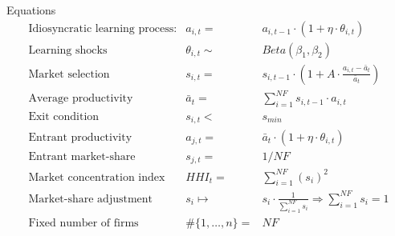 \documentclass[bigger,aspectratio=169]{beamer}
\begin{document}
\begin{frame}[label={sec:org4f0eff8}]{Equations}
\[ \begin{array}{lrl}
\mbox{Idiosyncratic learning process:} & a_{i,t} = &a_{i,t-1}\cdot (1 + \eta\cdot\theta_{i,t})\\
\mbox{Learning shocks} & \theta_{i,t} \sim  & Beta(\beta_1, \beta_2)\\
\mbox{Market selection} & s_{i,t} =  & s_{i,t-1} \cdot \left( 1 + A\cdot\frac{a_{i,t} - \bar{a}_{t}}{\bar{a}_{t}}\right) \\
\mbox{Average productivity} & \bar{a}_{t} =  & \sum_{i=1}^{NF} s_{i, t-1}\cdot a_{i,t} \\
\mbox{Exit condition} & s_{i,t} < & s_{min}\\
\mbox{Entrant productivity} & a_{j,t} =&  \bar{a}_{t}\cdot (1 + \eta\cdot\theta_{i,t})\\
\mbox{Entrant market-share} & s_{j,t} =& 1/NF \\
\mbox{Market concentration index} & HHI_{t} =& \sum_{i=1}^{NF} (s_{i})^2 \\
\mbox{Market-share adjustment} &  s_{i} \mapsto & s_{i}\cdot \frac{1}{\sum_{i=1}^{NF} s_{i}} \Rightarrow \sum_{i=1}^{NF} s_{i} = 1 \\
\mbox{Fixed number of firms} & \#\{1, \ldots, n\} =& NF
\end{array}\]
\end{frame}
\end{document}
